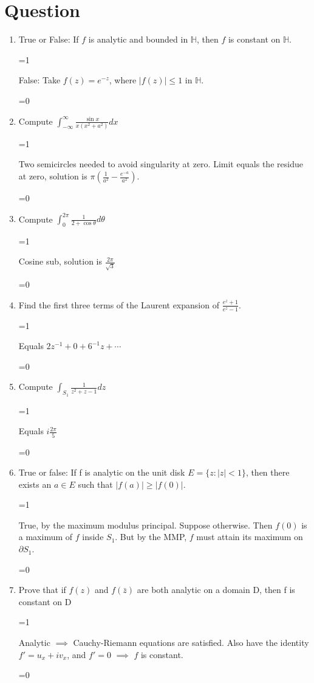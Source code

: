 \documentclass{article}
\def\showanswers{1}
\newcommand{\hide}[1]{
   \ifnum\showanswers=1
 
   #1 \vspace{\baselineskip}
   \fi
 
   \ifnum\showanswers=0
   \vspace{2\baselineskip} \hspace{2cm}
   \fi
}
\begin{document}
\section{Question}
\begin{enumerate}
   \item True or False: If $f$ is analytic and bounded in $\mathbb{H}$, then $f$ is constant on $\mathbb{H}$.
   \hide{
   False: Take $f(z) = e^{-z}$, where $|f(z)| \leq 1$ in $\mathbb{H}$.
   }
 
   \item Compute $\int_{-\infty}^{\infty} \frac{\sin x}{x(x^2+a^2)}dx$
   \hide{
   Two semicircles needed to avoid singularity at zero. Limit equals the residue at zero, solution is $\pi (\frac{1}{a^2} - \frac{e^{-a}}{a^2})$.
   }
   
   \item Compute $\int_0^{2\pi} \frac{1}{2+\cos\theta}d\theta$
   \hide{
   Cosine sub, solution is $\frac{2\pi}{\sqrt{3}}$
   }
   
   \item Find the first three terms of the Laurent expansion of $\frac{e^z+1}{e^z-1}$.
   \hide{
   Equals $2z^{-1} + 0 + 6^{-1}z + \cdots$
   }
   
  \item Compute $\int_{S_1} \frac{1}{z^2+z-1}dz$
   \hide{
    Equals $i\frac{2\pi}{5}$
   }
   
  \item True or false: If f is analytic on the unit disk $E = \{z : |z| < 1\}$, then there exists an $a \in E$ such
  that $|f (a)| \geq |f (0)|$.
   \hide{
   True, by the maximum modulus principal. Suppose otherwise. Then $f(0)$ is a maximum of $f$ inside $S_1$. But by the MMP, $f$ must attain its maximum on $\partial S_1$.
   }
   
   \item Prove that if $f(z)$ and $f (\bar{z})$ are both analytic on a domain D, then f is constant on D
   \hide{
   Analytic $\implies$ Cauchy-Riemann equations are satisfied. Also have the identity $f' = u_x + iv_x$, and $f' = 0$ $\implies$ $f$ is constant.
   }
   
\end{enumerate}
\end{document}
